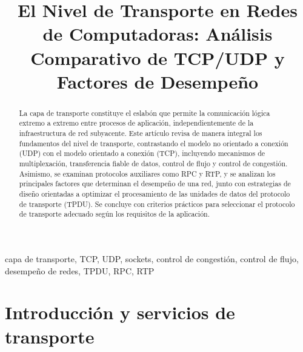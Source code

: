 \documentclass[conference]{IEEEtran}
\begin{document}
\title{El Nivel de Transporte en Redes de Computadoras: Análisis Comparativo de TCP/UDP y Factores de Desempeño}

\author{
}

\maketitle

\begin{abstract}
La capa de transporte constituye el eslabón que permite la comunicación lógica extremo a extremo entre procesos de aplicación, independientemente de la infraestructura de red subyacente. Este artículo revisa de manera integral los fundamentos del nivel de transporte, contrastando el modelo no orientado a conexión (UDP) con el modelo orientado a conexión (TCP), incluyendo mecanismos de multiplexación, transferencia fiable de datos, control de flujo y control de congestión. Asimismo, se examinan protocolos auxiliares como RPC y RTP, y se analizan los principales factores que determinan el desempeño de una red, junto con estrategias de diseño orientadas a optimizar el procesamiento de las unidades de datos del protocolo de transporte (TPDU). Se concluye con criterios prácticos para seleccionar el protocolo de transporte adecuado según los requisitos de la aplicación.
\end{abstract}

\begin{IEEEkeywords}
capa de transporte, TCP, UDP, sockets, control de congestión, control de flujo, desempeño de redes, TPDU, RPC, RTP
\end{IEEEkeywords}

\section{Introducción y servicios de transporte}
\end{document}
